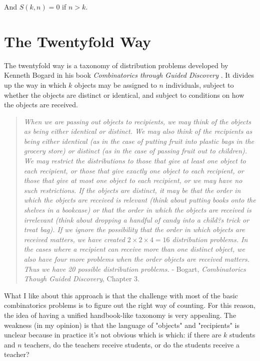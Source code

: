 And $S(k,n) = 0$ if $n>k$.




\section{The Twentyfold Way}
\label{twentyfoldway}

The twentyfold way is a taxonomy of distribution problems developed by Kenneth Bogard in his book \textit{Combinatorics through Guided Discovery} \cite{bogart2004combinatorics}. It divides up the way in which $k$ objects may be assigned to $n$ individuals, subject to whether the objects are distinct or identical, and subject to conditions on how the objects are received.


\begin{quote}
\textit{When we are passing out objects to recipients, we may think of the objects as being either identical or distinct. We may also think of the recipients as being either identical (as in the case of putting fruit into plastic bags in the grocery store) or distinct (as in the case of passing fruit out to children). We may restrict the distributions to those that give at least one object to each recipient, or those that give exactly one object to each recipient, or those that give at most one object to each recipient, or we may have no such restrictions. If the objects are distinct, it may be that the order in which the objects are received is relevant (think about putting books onto the shelves in a bookcase) or that the order in which the objects are received is irrelevant (think about dropping a handful of candy into a child?s trick or treat bag). If we ignore the possibility that the order in which objects are received matters, we have created $2\times2\times4 = 16$ distribution problems. In the cases where a recipient can receive more than one distinct object, we also have four more problems when the order objects are received matters. Thus we have 20 possible distribution problems.} - Bogart, \textit{Combinatorics Though Guided Discovery}, Chapter 3.
\end{quote}


What I like about this approach is that the challenge with most of the basic combinatorics problems is to figure out the right way of counting. For this reason, the idea of having a unified handbook-like taxonomy is very appealing. The weakness (in my opinion) is that the language of "objects" and "recipients" is unclear because in practice it's not obvious which is which: if there are $k$ students and $n$ teachers, do the teachers receive students, or do the students receive a teacher? 


